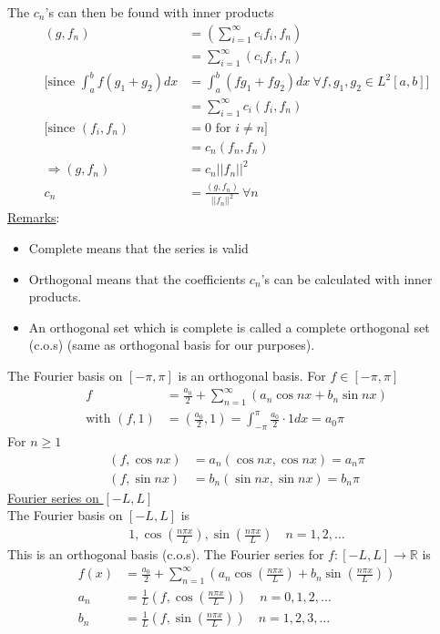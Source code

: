 \documentclass[12pt, letterpaper]{article}
\begin{document}
The $c_n$'s can then be found with inner products
\begin{align*}
    (g,f_n) &= \left(\sum_{i=1}^{\infty} c_i f_i, f_n\right) \\
    &= \sum_{i=1}^{\infty} (c_i f_i, f_n) \\
    \Bigg[\text{since } \int_{a}^{b} f(g_1+g_2)dx &= \int_{a}^{b} (fg_1 + fg_2)dx \ \forall f,g_1,g_2 \in L^2[a,b]\Bigg] \\
    &= \sum_{i=1}^{\infty} c_i(f_i,f_n) \\
    \big[\text{since } (f_i,f_n) &= 0 \text{ for } i\ne n\big] \\
    &= c_n (f_n,f_n) \\
    \Rightarrow (g,f_n) &= c_n ||f_n||^2 \\
    c_n &= \frac{(g,f_n)}{||f_n||^2}\ \forall n
\end{align*}
\underline{Remarks}:
\begin{itemize}
    \item Complete means that the series is valid
    \item Orthogonal means that the coefficients $c_n$'s can be calculated with 
    inner products.
    \item An orthogonal set which is complete is called a complete orthogonal set (c.o.s)
    (same as orthogonal basis for our purposes).
\end{itemize}
 The Fourier basis on $[-\pi,\pi]$ is an orthogonal basis. For $f\in[-\pi,\pi]$
\begin{align*}
    f &= \frac{a_0}{2} + \sum_{n=1}^{\infty}(a_n\cos nx + b_n \sin nx) \\
    \text{with } (f,1) &= (\frac{a_0}{2},1) = \int_{-\pi}^{\pi}\frac{a_0}{2}\cdot 1 dx = a_0 \pi
\end{align*}
For $n \ge 1$ 
\begin{align*}
    (f,\cos nx) &= a_n (\cos nx, \cos nx) = a_n \pi \\
    (f,\sin nx) &= b_n (\sin nx, \sin nx) = b_n \pi
\end{align*}
\underline{Fourier series on $[-L,L]$} \\
The Fourier basis on $[-L,L]$ is 
\begin{align*}
    1, \cos\left(\frac{n\pi x}{L}\right), \sin\left(\frac{n\pi x}{L}\right)\quad n = 1,2,\dots
\end{align*}
This is an orthogonal basis (c.o.s). The Fourier series for $f:[-L,L] \rightarrow \mathbb{R}$ is 
\begin{align*}
    f(x) &= \frac{a_0}{2} + \sum_{n=1}^{\infty}\left(a_n\cos\left(\frac{n\pi x}{L}\right) + b_n \sin\left(\frac{n\pi x}{L}\right)\right) \\
    a_n &= \frac 1L\left(f,\cos\left(\frac{n\pi x}{L}\right)\right) \quad n = 0,1,2,\dots \\
    b_n &= \frac 1L\left(f,\sin\left(\frac{n\pi x}{L}\right)\right) \quad n = 1,2,3,\dots
\end{align*}
\end{document}
